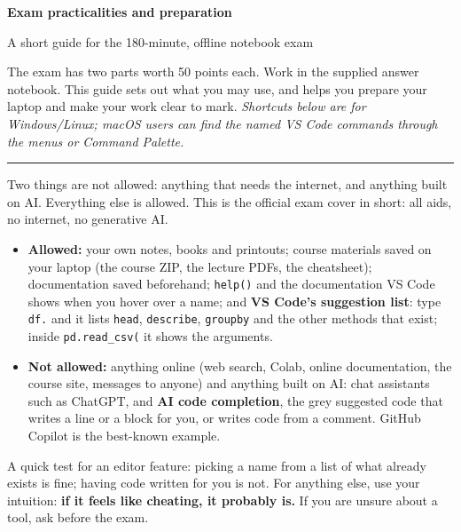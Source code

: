 \documentclass[10pt,a4paper]{article}
\newcommand{\sectionhead}[1]{\Needspace{5\baselineskip}\vspace{4pt}{\large\bfseries\color{accent}#1}\par\vspace{1pt}\hrule\vspace{3pt}}
\begin{document}
{\LARGE\bfseries\color{ink} Exam practicalities and preparation}\par
\vspace{2pt}
{\color{accent} A short guide for the 180-minute, offline notebook exam}\par
\vspace{7pt}
The exam has two parts worth 50 points each. Work in the supplied answer notebook. This guide sets out what you may use, and helps you prepare your laptop and make your work clear to mark.
\emph{Shortcuts below are for Windows/Linux; macOS users can find the named VS Code commands through the menus or Command Palette.}

\sectionhead{What you may use}
Two things are not allowed: anything that needs the internet, and anything built on AI. Everything else is allowed. This is the official exam cover in short: all aids, no internet, no generative AI.
\begin{itemize}
\item \textbf{Allowed:} your own notes, books and printouts; course materials saved on your laptop (the course ZIP, the lecture PDFs, the cheatsheet); documentation saved beforehand; \texttt{help()} and the documentation VS Code shows when you hover over a name; and \textbf{VS Code's suggestion list}: type \texttt{df.} and it lists \texttt{head}, \texttt{describe}, \texttt{groupby} and the other methods that exist; inside \texttt{pd.read\_csv(} it shows the arguments.
\item \textbf{Not allowed:} anything online (web search, Colab, online documentation, the course site, messages to anyone) and anything built on AI: chat assistants such as ChatGPT, and \textbf{AI code completion}, the grey suggested code that writes a line or a block for you, or writes code from a comment. GitHub Copilot is the best-known example.
\end{itemize}
A quick test for an editor feature: picking a name from a list of what already exists is fine; having code written for you is not. For anything else, use your intuition: \textbf{if it feels like cheating, it probably is.} If you are unsure about a tool, ask before the exam.
\end{document}
